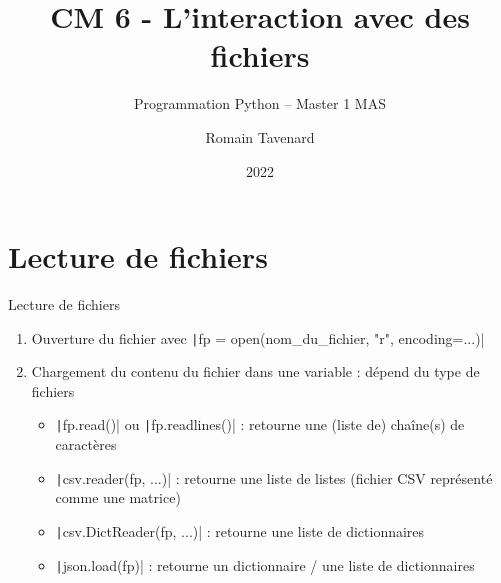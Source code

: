 \documentclass[10pt]{beamer}
\title[M1 MAS -- Python -- Fichiers]{CM 6 - L'interaction avec des fichiers}
\subtitle{Programmation Python -- Master 1 MAS}
\author{Romain Tavenard}
\date{2022}
\institute{%
\hypersetup{urlcolor=.}
\makebox[2.2ex][c]{\faEnvelope}\enspace\href{mailto:romain.tavenard@univ-rennes2.fr}{\texttt{romain.tavenard@univ-rennes2.fr}}\\%
}
\begin{document}
\maketitle

\section{Lecture de fichiers}
\begin{frame}[fragile]{Lecture de fichiers}
  \begin{enumerate}
    \item Ouverture du fichier avec \texttt|fp = open(nom_du_fichier, "r", encoding=...)|
    \item Chargement du contenu du fichier dans une variable : dépend du type de fichiers
    \begin{itemize}
      \item \texttt|fp.read()| ou \texttt|fp.readlines()| : retourne une (liste de) chaîne(s) de caractères
      \item \texttt|csv.reader(fp, ...)| : retourne une liste de listes (fichier CSV représenté comme une matrice)
      \item \texttt|csv.DictReader(fp, ...)| : retourne une liste de dictionnaires
      \item \texttt|json.load(fp)| : retourne un dictionnaire / une liste de dictionnaires
    \end{itemize}
  \end{enumerate}

\end{frame}
\end{document}
